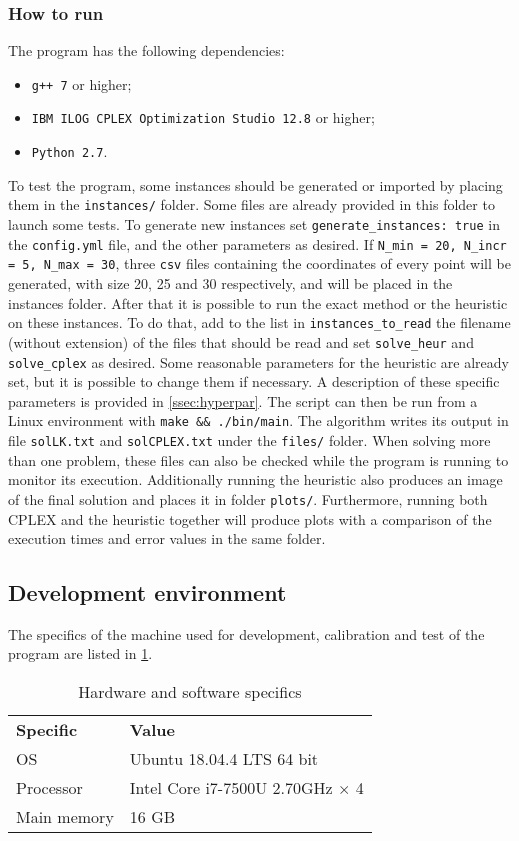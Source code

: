 \subsubsection{How to run}
The program has the following dependencies:
\begin{itemize}
	\setlength\itemsep{0.03em}
	\item \texttt{g++ 7} or higher;
	\item \texttt{IBM ILOG CPLEX Optimization Studio 12.8} or higher;
	\item \texttt{Python 2.7}.
\end{itemize}

To test the program, some instances should be generated or imported by placing them in the \texttt{instances/} folder. Some files are already provided in this folder to launch some tests. To generate new instances set \texttt{generate\_instances: true} in the \texttt{config.yml} file, and the other parameters as desired. If \texttt{N\_min = 20, N\_incr = 5, N\_max = 30}, three \texttt{csv} files containing the coordinates of every point will be generated, with size 20, 25 and 30 respectively, and will be placed in the instances folder. After that it is possible to run the exact method or the heuristic on these instances. To do that, add to the list in \texttt{instances\_to\_read} the filename (without extension) of the files that should be read and set \texttt{solve\_heur} and \texttt{solve\_cplex} as desired. Some reasonable parameters for the heuristic are already set, but it is possible to change them if necessary. A description of these specific parameters is provided in \cref{ssec:hyperpar}.
The script can then be run from a Linux environment with \texttt{make \&\& ./bin/main}. The algorithm writes its output in file \texttt{solLK.txt} and \texttt{solCPLEX.txt} under the \texttt{files/} folder. When solving more than one problem, these files can also be checked while the program is running to monitor its execution. Additionally running the heuristic also produces an image of the final solution and places it in folder \texttt{plots/}. Furthermore, running both CPLEX and the heuristic together will produce plots with a comparison of the execution times and error values in the same folder. \\

\subsection{Development environment}
The specifics of the machine used for development, calibration and test of the program are listed in \cref{tab:maspecs}.
\begin{table}[H]
	\caption{Hardware and software specifics}
	\label{tab:maspecs}
	\centering
	\begin{tabular}[t]{ll}
		\rowcolor[HTML]{EFEFEF}
		\textbf{Specific} & \textbf{Value} \\
		OS       & Ubuntu 18.04.4 LTS 64 bit	   \\
		Processor & Intel Core i7-7500U 2.70GHz $\times$ 4     \\
		Main memory  & 16 GB  
	\end{tabular}
\end{table}


